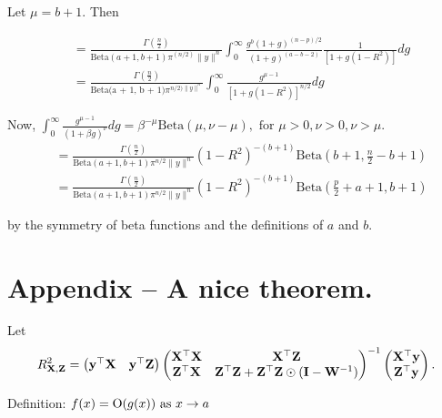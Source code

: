 \documentclass{amsart}[12pt]
\theoremstyle{definition}
\begin{document}
Let $\mu = b + 1$. Then

\begin{equation*}
	\begin{array}{ll}
		  & =\frac{\Gamma(\frac{n}{2})}{\text{Beta}(a + 1,  b + 1) \pi^(n/2) \| y \|^n}  
		\int_0^\infty \frac{g^b(1 + g)^{(n - p)/2}}{(1 + g)^{(a - b - 2)}} \frac{1}{[1 + g(1 - R^2)]} dg \\
		  & = \frac{\Gamma(\frac{n}{2})}{\text{Beta(a + 1, b + 1)} \pi^{n/2) \| y \|^n}} 
		\int_0^\infty \frac{g^{\mu - 1}}{[1 + g (1 - R^2)]^{n/2}} dg
	\end{array}
\end{equation*}

Now, $\int_0^\infty \frac{g^{\mu - 1}}{(1 + \beta g)^\nu} dg = \beta^{-\mu} \text{Beta}(\mu, \nu - \mu), \text{ for } \mu > 0, \nu > 0, \nu > \mu$.
\begin{equation*}
	\begin{array}{ll}
		  & = \frac{\Gamma(\frac{n}{2})}{\text{Beta}(a + 1, b + 1) \pi^{n / 2} \| y \|^n} (1 - R^2)^{-(b + 1)} \text{Beta}(b + 1, \frac{n}{2} - b + 1) \\
		  & = \frac{\Gamma(\frac{n}{2})}{\text{Beta}(a + 1, b + 1) \pi^{n / 2} \| y \|^n} (1 - R^2)^{-(b + 1)} \text{Beta}(\frac{p}{2} + a + 1, b + 1) 
	\end{array}
\end{equation*}

by the symmetry of beta functions and the definitions of $a$ and $b$.

\section{Appendix -- A nice theorem.}
Let
\begin{equation*}
	R^2_{{\bf X}, {\bf Z}} = 
	\begin{pmatrix}
		{\bf y}^\top {\bf X} & {\bf y}^\top {\bf Z} 
	\end{pmatrix}
	\begin{pmatrix}
		{\bf X}^\top {\bf X} & {\bf X}^\top {\bf Z}                                       \\
		{\bf Z}^\top {\bf X} & {\bf Z}^\top {\bf Z} + {\bf Z}^\top {\bf Z} \odot ({\bf I} - {\bf W}^{-1}) 
	\end{pmatrix}^{-1}
	\begin{pmatrix}
		{\bf X}^\top {\bf y} \\
		{\bf Z}^\top {\bf y} 
	\end{pmatrix}.
\end{equation*}

Definition:
$f(x) = \text{O}(g(x)) \text{ as } x \to a$
\end{document}
